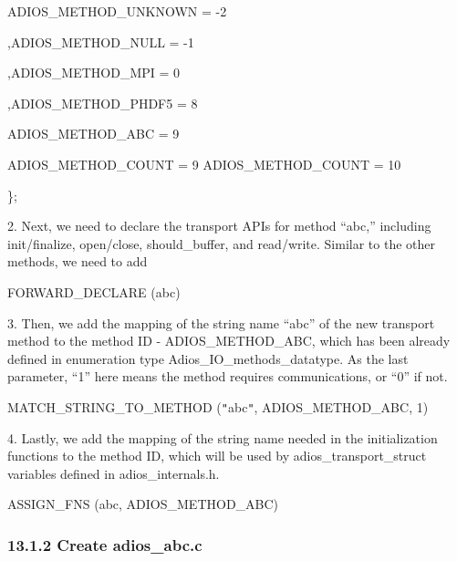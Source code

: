 \vspace{10pt}
\parindent=79pt
ADIOS\_METHOD\_UNKNOWN   = -2

\vspace{10pt}
\parindent=75pt
,ADIOS\_METHOD\_NULL              = -1

\vspace{10pt}
,ADIOS\_METHOD\_MPI                 = 0

\vspace{23pt}
\parindent=226pt
,ADIOS\_METHOD\_PHDF5            = 8

\vspace{10pt}
\parindent=0pt
ADIOS\_METHOD\_ABC  = 9

\vspace{10pt}
\parindent=75pt
ADIOS\_METHOD\_COUNT           = 9   ADIOS\_METHOD\_COUNT  = 10

\vspace{10pt}
\};

\vspace{23pt}
\parindent=0pt
2. Next, we need to declare the transport APIs for method ``abc,'' including init/finalize, 
open/close, should\_buffer, and read/write. Similar to the other methods, we need 
to add 

\vspace{10pt}
\parindent=18pt
FORWARD\_DECLARE (abc)

\vspace{10pt}
\parindent=0pt
3. Then, we add the mapping of the string name ``abc'' of the new transport method 
to the method ID - ADIOS\_METHOD\_ABC, which has been already defined in enumeration 
type Adios\_IO\_methods\_datatype. As the last parameter, ``1'' here means the 
method requires communications, or ``0'' if not.

\vspace{10pt}
MATCH\_STRING\_TO\_METHOD (\texttt{"}abc\texttt{"}, ADIOS\_METHOD\_ABC, 1)     
        

\vspace{10pt}
4. Lastly, we add the mapping of the string name needed in the initialization functions 
to the method ID, which will be used by adios\_transport\_struct variables defined 
in adios\_internals.h.

\vspace{10pt}
ASSIGN\_FNS (abc, ADIOS\_METHOD\_ABC)\label{HToc84890313}\label{HToc212016688}\label{HToc212016930}\label{HToc182553455}

\vspace{10pt}
\subsubsection*{{\large \textbf{13.1.2 Create adios\_abc.c}}}

